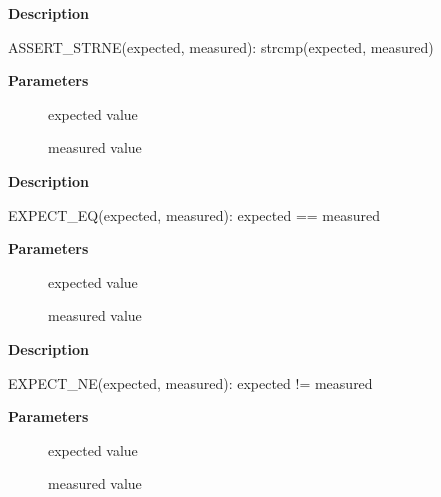 \documentclass[a4paper,8pt,english]{sphinxmanual}
\begin{document}
\textbf{Description}

ASSERT\_STRNE(expected, measured): strcmp(expected, measured)

\begin{fulllineitems}
\label{dev-tools/kselftest:c.EXPECT_EQ}
\end{fulllineitems}


\textbf{Parameters}
\begin{description}
\item[{}] \leavevmode
expected value

\item[{}] \leavevmode
measured value

\end{description}

\textbf{Description}

EXPECT\_EQ(expected, measured): expected == measured

\begin{fulllineitems}
\label{dev-tools/kselftest:c.EXPECT_NE}
\end{fulllineitems}


\textbf{Parameters}
\begin{description}
\item[{}] \leavevmode
expected value

\item[{}] \leavevmode
measured value

\end{description}

\textbf{Description}

EXPECT\_NE(expected, measured): expected != measured

\begin{fulllineitems}
\label{dev-tools/kselftest:c.EXPECT_LT}
\end{fulllineitems}


\textbf{Parameters}
\begin{description}
\item[{}] \leavevmode
expected value

\item[{}] \leavevmode
measured value

\end{description}
\end{document}
